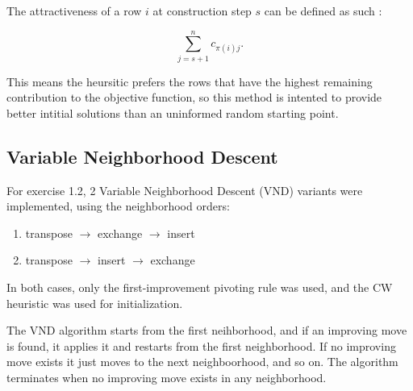The attractiveness of a row \(i\) at construction step \(s\) can be defined as such :

\[
\sum_{j=s+1}^{n} c_{\pi(i)j}.
\]

This means the heursitic prefers the rows that have the highest remaining contribution to the objective function, so this method is intented to provide better intitial solutions than an uninformed random starting point.



\subsection{Variable Neighborhood Descent}

For exercise 1.2, 2 Variable Neighborhood Descent (VND) variants were implemented, using the neighborhood orders:

\begin{enumerate}[leftmargin=1.5em]
    \item transpose \(\rightarrow\) exchange \(\rightarrow\) insert
    \item transpose \(\rightarrow\) insert \(\rightarrow\) exchange
\end{enumerate}

In both cases, only the first-improvement pivoting rule was used, and the CW heuristic was used for initialization.

The VND algorithm starts from the first neihborhood, and if an improving move is found, it applies it and restarts from the first neighborhood. If no improving move exists it just moves to the next neighboorhood, and so on. The algorithm terminates when no improving move exists in any neighborhood.